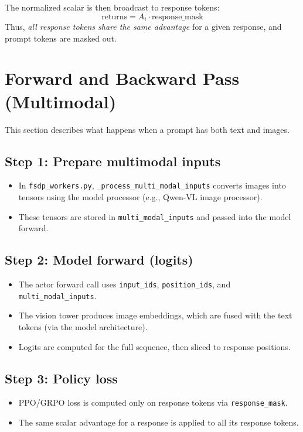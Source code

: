 \documentclass[11pt]{article}
\begin{document}
The normalized scalar is then broadcast to response tokens:
\begin{equation}
  \text{returns} = A_i \cdot \text{response\_mask}
\end{equation}
Thus, \emph{all response tokens share the same advantage} for a given response, and prompt tokens are masked out.

\section{Forward and Backward Pass (Multimodal)}
This section describes what happens when a prompt has both text and images.

\subsection{Step 1: Prepare multimodal inputs}
\begin{itemize}
  \item In \texttt{fsdp\_workers.py}, \texttt{\_process\_multi\_modal\_inputs} converts images into tensors using the model processor (e.g., Qwen-VL image processor).
  \item These tensors are stored in \texttt{multi\_modal\_inputs} and passed into the model forward.
\end{itemize}

\subsection{Step 2: Model forward (logits)}
\begin{itemize}
  \item The actor forward call uses \texttt{input\_ids}, \texttt{position\_ids}, and \texttt{multi\_modal\_inputs}.
  \item The vision tower produces image embeddings, which are fused with the text tokens (via the model architecture).
  \item Logits are computed for the full sequence, then sliced to response positions.
\end{itemize}

\subsection{Step 3: Policy loss}
\begin{itemize}
  \item PPO/GRPO loss is computed only on response tokens via \texttt{response\_mask}.
  \item The same scalar advantage for a response is applied to all its response tokens.
\end{itemize}
\end{document}
